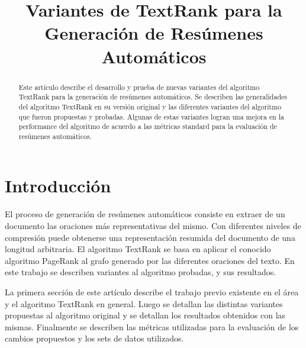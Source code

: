 \documentclass{llncs}
\begin{document}
\frontmatter

\title{Variantes de TextRank para la Generación de Resúmenes Automáticos}



\maketitle

\begin{abstract}
Este artículo describe el desarrollo y prueba de nuevas variantes del algoritmo
TextRank para la generación de resúmenes automáticos. Se describen las generalidades
del algoritmo TextRank en su versión original y las diferentes variantes del 
algoritmo que fueron propuestas y probadas. Algunas de estas variantes logran una mejora en
la performance del algoritmo de acuerdo a las métricas standard para la evaluación de
resúmenes automáticos. 

\end{abstract}

\section{Introducción}
El proceso de generación de resúmenes automáticos consiste en extraer de un documento las oraciones más representativas del mismo. Con diferentes niveles de compresión puede obtenerse una representación resumida del documento de una longitud arbitraria. El algoritmo TextRank se basa en aplicar el conocido algoritmo PageRank al grafo generado por las diferentes oraciones del texto. En este trabajo se describen variantes al algoritmo probadas, y sus resultados.

La primera sección de este artículo describe el trabajo previo existente en el área y el algoritmo TextRank en general. Luego se detallan las distintas variantes propuestas al algoritmo original y se detallan los resultados obtenidos con las mismas. Finalmente se describen las métricas utilizadas para la evaluación de los cambios propuestos y los sets de datos utilizados.
\end{document}
